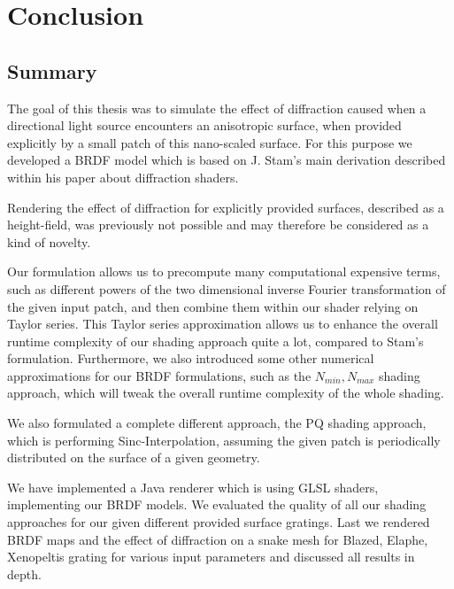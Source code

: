 \chapter{Conclusion}
\section{Summary}
The goal of this thesis was to simulate the effect of diffraction caused when a directional light source encounters an anisotropic surface, when provided explicitly by a small patch of this nano-scaled surface. For this purpose we developed a BRDF model which is based on J. Stam's main derivation described within his paper about diffraction shaders. 

Rendering the effect of diffraction for explicitly provided surfaces, described as a height-field, was previously not possible and may therefore be considered as a kind of novelty.

Our formulation allows us to precompute many computational expensive terms, such as different powers of the two dimensional inverse Fourier transformation of the given input patch, and then combine them within our shader relying on Taylor series. This Taylor series approximation allows us to enhance the overall runtime complexity of our shading approach quite a lot, compared to Stam's formulation. Furthermore, we also introduced some other numerical approximations for our BRDF formulations, such as the $N_{min}, N_{max}$ shading approach, which will tweak the overall runtime complexity of the whole shading. 

We also formulated a complete different approach, the PQ shading approach, which is performing Sinc-Interpolation, assuming the given patch is periodically distributed on the surface of a given geometry. 

We have implemented a Java renderer which is using GLSL shaders, implementing our BRDF models. We evaluated the quality of all our shading approaches for our given different provided surface gratings. 
Last we rendered BRDF maps and the effect of diffraction on a snake mesh for Blazed, Elaphe, Xenopeltis grating for various input parameters and discussed all results in depth.

